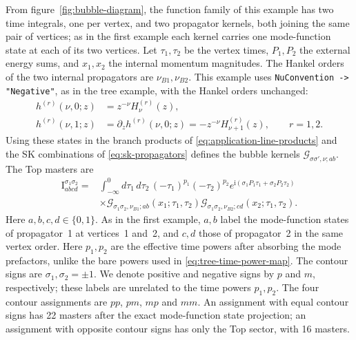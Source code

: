 \documentclass[11pt,a4paper]{article}
\numberwithin{table}{section}
\newcommand{\ii}{\mathrm i}
\begin{document}
From figure~\ref{fig:bubble-diagram}, the function family of this example has two time
integrals, one per vertex, and two propagator kernels, both joining the same pair of vertices; as
in the first example each kernel carries one mode-function state at each of its two vertices.
Let $\tau_1,\tau_2$ be the vertex times, $P_1,P_2$ the external energy sums,
and $x_1,x_2$ the internal momentum magnitudes.
The Hankel orders of the two internal propagators are $\nu_{B1},\nu_{B2}$.
This example uses \texttt{NuConvention -> "Negative"}, as in the tree example,
with the Hankel orders unchanged:
\begin{equation}
 \begin{aligned}
 h^{(r)}(\nu,0;z)&=z^{-\nu}H^{(r)}_\nu(z),\\
 h^{(r)}(\nu,1;z)&=\partial_z h^{(r)}(\nu,0;z)
                   =-z^{-\nu}H^{(r)}_{\nu+1}(z),\qquad r=1,2.
 \end{aligned}
 \label{eq:bubble-endpoint-states}
\end{equation}
Using these states in the branch products of \eqref{eq:application-line-products} and the
SK combinations of \eqref{eq:sk-propagators} defines the bubble kernels
$\mathcal G_{\sigma\sigma',\nu;ab}$. The Top masters are
\begin{equation}
 \begin{aligned}
 \text{I}^{\sigma_1\sigma_2}_{abcd}
 ={}&\int_{-\infty}^{0}d\tau_1\,d\tau_2\,
 (-\tau_1)^{p_1}(-\tau_2)^{p_2}
 e^{\ii(\sigma_1P_1\tau_1+\sigma_2P_2\tau_2)}\\
 &\times\mathcal G_{\sigma_1\sigma_2,\nu_{B1};ab}(x_1;\tau_1,\tau_2)
 \mathcal G_{\sigma_1\sigma_2,\nu_{B2};cd}(x_2;\tau_1,\tau_2).
 \end{aligned}
 \label{eq:bubble-indexed-masters}
\end{equation}
Here $a,b,c,d\in\{0,1\}$. As in the first example, $a,b$ label the mode-function states of
propagator~1 at vertices~1 and~2, and $c,d$ those of propagator~2 in the same vertex order.
Here $p_1,p_2$ are the effective time powers after absorbing the mode
prefactors, unlike the bare powers used in \eqref{eq:tree-time-power-map}.
The contour signs are $\sigma_1,\sigma_2=\pm1$.
We denote positive and negative signs by $p$ and $m$, respectively;
these labels are unrelated to the time powers $p_1,p_2$.
The four contour assignments are $pp$, $pm$, $mp$ and $mm$.
An assignment with equal contour signs has 22 masters after the
exact mode-function state projection; an assignment with opposite contour signs has only the
Top sector, with 16 masters.
\end{document}
